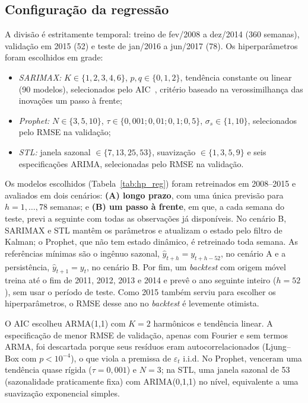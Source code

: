 \documentclass[conference,a4paper]{IEEEtran}
\newcommand{\tabfont}{\footnotesize}
\begin{document}
\subsection{Configuração da regressão}
A divisão é estritamente temporal: treino de fev/2008 a dez/2014 (360 semanas), validação em
2015 (52) e teste de jan/2016 a jun/2017 (78). Os hiperparâmetros foram escolhidos em grade:
\begin{itemize}
\item \emph{SARIMAX:} $K\in\{1,2,3,4,6\}$, $p,q\in\{0,1,2\}$, tendência constante ou linear
(90 modelos), selecionados pelo AIC~\cite{akaike1974new}, critério baseado na verossimilhança
das inovações um passo à frente;
\item \emph{Prophet:} $N\in\{3,5,10\}$, $\tau\in\{0{,}001;0{,}01;0{,}1;0{,}5\}$,
$\sigma_s\in\{1,10\}$, selecionados pelo RMSE na validação;
\item \emph{STL:} janela sazonal $\in\{7,13,25,53\}$, suavização $\in\{1,3,5,9\}$ e seis
especificações ARIMA, selecionadas pelo RMSE na validação.
\end{itemize}
Os modelos escolhidos (Tabela~\ref{tab:hp_reg}) foram retreinados em 2008--2015 e avaliados
em dois cenários: \textbf{(A) longo prazo}, com uma única previsão para $h=1,\dots,78$ semanas;
e \textbf{(B) um passo à frente}, em que, a cada semana do teste, previ a seguinte com todas
as observações já disponíveis. No cenário B, SARIMAX e STL mantêm os parâmetros e atualizam o
estado pelo filtro de Kalman; o Prophet, que não tem estado dinâmico, é retreinado toda semana.
As referências mínimas são o ingênuo sazonal, $\hat y_{t+h}=y_{t+h-52}$, no cenário A e a
persistência, $\hat y_{t+1}=y_t$, no cenário B. Por fim, um \textit{backtest} com origem móvel
treina até o fim de 2011, 2012, 2013 e 2014 e prevê o ano seguinte inteiro ($h=52$), sem usar
o período de teste. Como 2015 também serviu para escolher os hiperparâmetros, o RMSE desse
ano no \textit{backtest} é levemente otimista.

\begin{table}[!t]
\centering
\caption{Hiperparâmetros escolhidos e RMSE (°C) na validação (2015), com os modelos treinados até 2014.}
\label{tab:hp_reg}
\tabfont

\end{table}

O AIC escolheu ARMA(1,1) com $K=2$ harmônicos e tendência linear. A especificação de menor
RMSE de validação, apenas com Fourier e sem termos ARMA, foi descartada porque seus resíduos
eram autocorrelacionados (Ljung--Box com $p<10^{-4}$), o que viola a premissa de
$\varepsilon_t$ i.i.d. No Prophet, venceram uma tendência quase rígida ($\tau=0{,}001$) e
$N=3$; na STL, uma janela sazonal de 53 (sazonalidade praticamente fixa) com ARIMA(0,1,1) no
nível, equivalente a uma suavização exponencial simples.
\end{document}
